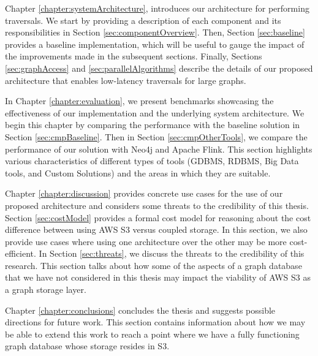 \medskip
Chapter \ref{chapter:systemArchitecture}, introduces our architecture for
performing traversals. We start by providing a description of each component and
its responsibilities in Section \ref{sec:componentOverview}. 
Then, Section \ref{sec:baseline} provides a baseline implementation, 
which will be useful to gauge
the impact of the improvements made in the subsequent sections. Finally, 
Sections \ref{sec:graphAccess} and \ref{sec:parallelAlgorithms} 
describe the details of our proposed architecture
that enables low-latency traversals for large graphs.

\medskip
In Chapter \ref{chapter:evaluation}, we present benchmarks showcasing the
effectiveness of our implementation and the underlying system architecture. We begin this chapter by
comparing the performance with the baseline solution in
Section \ref{sec:cmpBaseline}. Then in Section \ref{sec:cmpOtherTools}, we
compare the performance of our solution with Neo4j and Apache Flink. This
section highlights various characteristics of different types of tools (GDBMS,
RDBMS, Big Data tools, and Custom Solutions) and the areas in which they 
are suitable. 

\medskip
Chapter \ref{chapter:discussion} provides concrete use cases for the use of our
proposed architecture and considers some threats to the credibility of this
thesis. Section \ref{sec:costModel} provides a formal cost model for reasoning
about the cost difference between using AWS S3 versus coupled storage. In this
section, we also provide use cases where using one architecture over the other
may be more cost-efficient. In Section \ref{sec:threats}, we discuss the threats
to the credibility of this research. This section talks about how some of the
aspects of a graph database that we have not considered in this thesis may
impact the viability of AWS S3 as a graph storage layer. 

\medskip
Chapter \ref{chapter:conclusions} concludes the thesis and
suggests possible directions for future work. This section contains information
about how we may be able to extend this work to reach a point where we have a
fully functioning graph database whose storage resides in S3.
